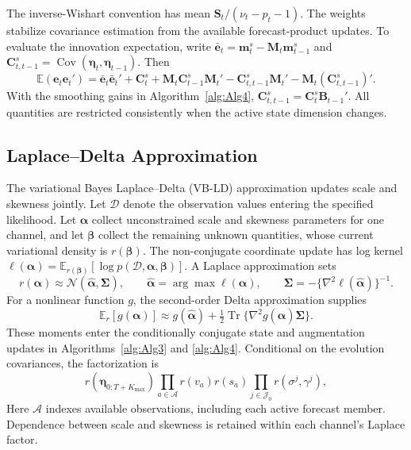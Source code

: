 The inverse-Wishart convention has mean $\mathbf S_t/(\nu_t-p_t-1)$. The weights stabilize covariance estimation from the available forecast-product updates. To evaluate the innovation expectation, write $\bar{\mathbf e}_t=\mathbf m_t^s-\mathbf M_t\mathbf m_{t-1}^s$ and $\mathbf C_{t,t-1}^s=\operatorname{Cov}(\boldsymbol\eta_t,\boldsymbol\eta_{t-1})$. Then
\[
\mathbb E(\mathbf e_t\mathbf e_t')=
\bar{\mathbf e}_t\bar{\mathbf e}_t'+\mathbf C_t^s+
\mathbf M_t\mathbf C_{t-1}^s\mathbf M_t'
-\mathbf C_{t,t-1}^s\mathbf M_t'-\mathbf M_t(\mathbf C_{t,t-1}^s)'.
\]
With the smoothing gains in Algorithm~\ref{alg:Alg4}, $\mathbf C_{t,t-1}^s=\mathbf C_t^s\mathbf B_{t-1}'$. All quantities are restricted consistently when the active state dimension changes.

\subsection{Laplace--Delta Approximation}
\label{app:vblad}

The variational Bayes Laplace--Delta (VB-LD) approximation updates scale and skewness jointly. Let \(\mathcal D\) denote the observation values entering the specified likelihood. Let \(\boldsymbol\alpha\) collect unconstrained scale and skewness parameters for one channel, and let \(\boldsymbol\beta\) collect the remaining unknown quantities, whose current variational density is \(r(\boldsymbol\beta)\). The non-conjugate coordinate update has log kernel
\(\ell(\boldsymbol\alpha)=\mathbb E_{r(\boldsymbol\beta)}[\log p(\mathcal D,\boldsymbol\alpha,\boldsymbol\beta)]\).
A Laplace approximation sets
\[
r(\boldsymbol\alpha)\approx\mathcal N(\widehat{\boldsymbol\alpha},\boldsymbol\Sigma),\qquad
\widehat{\boldsymbol\alpha}=\arg\max\ell(\boldsymbol\alpha),\qquad
\boldsymbol\Sigma=-\{\nabla^2\ell(\widehat{\boldsymbol\alpha})\}^{-1}.
\]
For a nonlinear function \(g\), the second-order Delta approximation supplies
\[
\mathbb E_r[g(\boldsymbol\alpha)]\approx g(\widehat{\boldsymbol\alpha})+
\tfrac12\operatorname{Tr}\{\nabla^2g(\widehat{\boldsymbol\alpha})\boldsymbol\Sigma\}.
\]
These moments enter the conditionally conjugate state and augmentation updates in Algorithms~\ref{alg:Alg3} and \ref{alg:Alg4}. Conditional on the evolution covariances, the factorization is
\[
r(\boldsymbol\eta_{0:T+K_{\max}})\prod_{a\in\mathcal A}r(v_a)r(s_a)
\prod_{j\in\mathcal J_0}r(\sigma^j,\gamma^j),
\]
Here $\mathcal A$ indexes available observations, including each active forecast member. Dependence between scale and skewness is retained within each channel's Laplace factor.

